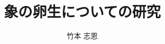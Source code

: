 \documentclass[bachelor]{INIAD}%
\title{象の卵生についての研究}
\author{竹本 志恩}
\begin{document}
\maketitle%

\frontmatter%



\begin{abstract}%

\end{abstract}

{\makeatletter
\let\ps@jpl@in\ps@empty
\makeatother
\pagestyle{empty}
\tableofcontents
\clearpage}

\mainmatter%






\backmatter%


\appendix%
\end{document}
